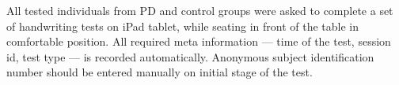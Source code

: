 \begin{comment}
(2)

During the completion of the tasks stylus performs on–surface movements, each change of the position of the stylus is registered as a separate event with relevant data – x–axis position, y–axis position, time and pressure. Every registered movement event is essentially a line from a data matrix consisting of n rows and 4 columns, where n is the total amount of movement events produced during a single completion of one task or subtask. Each data matrix is saved separately for further processing as raw data. The process of data flow is depicted in Figure.

(3)

Subjects were rested and seated in front of the table in comfort- able position. Each subject was asked to complete a handwriting task according to the prepared pre-filled template at a comfortable speed. Subjects were allowed to repeat the task in case of some error or mistake during handwriting. The pre-filled template is depicted. The pre-filled template was shown to the subjects; no restrictions about the number of repetitions of syllables/words in tasks or their height were given.
A tablet was overlaid with an empty paper template (containing only printed lines and square box specifying area for Archimedean spiral), and a special ink pen was held in a normal fashion, allowing for immediate full visual feedback. The signals were recorded using the Intuos 4M (Wacom technology) digitizing tablet.

Digitized signals were acquired during the movements executed while exerting pressure on the writing surface (on-surface movement) and during the movement above the writing surface (in-air movement). The perpendicular pressure exerted on the tablet surface was also recorded. The recordings started when the pen touched the surface of the digitizer and finished when the task was completed. The tablet captured the following dynamic features (time-sequences): x-coordinate, x[t]; y-coordinate, y[t]; time stamp, s[t]; button status, b[t]; pressure, p[t]; and discrete time t. Button status is a binary variable, being 0 for in-air movement and 1 for on-surface movement.

The tablet sampling rate was 100 samples per second; the acquisition software was developed by the research team. Subsequent analysis was performed using Matlab and Python programming language.

\end{comment}

All tested individuals from PD and control groups were asked to complete a set of handwriting tests on iPad tablet, while seating in front of the table in comfortable position. All required meta information --- time of the test, session id, test type --- is recorded automatically. Anonymous subject identification number should be entered manually on initial stage of the test. 

